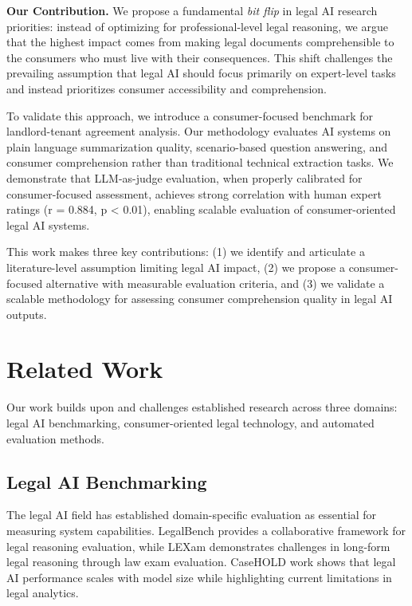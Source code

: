 \documentclass{article}
\begin{document}
\textbf{Our Contribution.} We propose a fundamental \emph{bit flip} in legal AI research priorities: instead of optimizing for professional-level legal reasoning, we argue that the highest impact comes from making legal documents comprehensible to the consumers who must live with their consequences. This shift challenges the prevailing assumption that legal AI should focus primarily on expert-level tasks and instead prioritizes consumer accessibility and comprehension.

To validate this approach, we introduce a consumer-focused benchmark for landlord-tenant agreement analysis. Our methodology evaluates AI systems on plain language summarization quality, scenario-based question answering, and consumer comprehension rather than traditional technical extraction tasks. We demonstrate that LLM-as-judge evaluation, when properly calibrated for consumer-focused assessment, achieves strong correlation with human expert ratings (r = 0.884, p < 0.01), enabling scalable evaluation of consumer-oriented legal AI systems.

This work makes three key contributions: (1) we identify and articulate a literature-level assumption limiting legal AI impact, (2) we propose a consumer-focused alternative with measurable evaluation criteria, and (3) we validate a scalable methodology for assessing consumer comprehension quality in legal AI outputs.

\section{Related Work}

Our work builds upon and challenges established research across three domains: legal AI benchmarking, consumer-oriented legal technology, and automated evaluation methods.

\subsection{Legal AI Benchmarking}

The legal AI field has established domain-specific evaluation as essential for measuring system capabilities. LegalBench \cite{guha2023legalbench} provides a collaborative framework for legal reasoning evaluation, while LEXam \cite{fan2025lexam} demonstrates challenges in long-form legal reasoning through law exam evaluation. CaseHOLD work \cite{arvin2025identifying} shows that legal AI performance scales with model size while highlighting current limitations in legal analytics.
\end{document}

